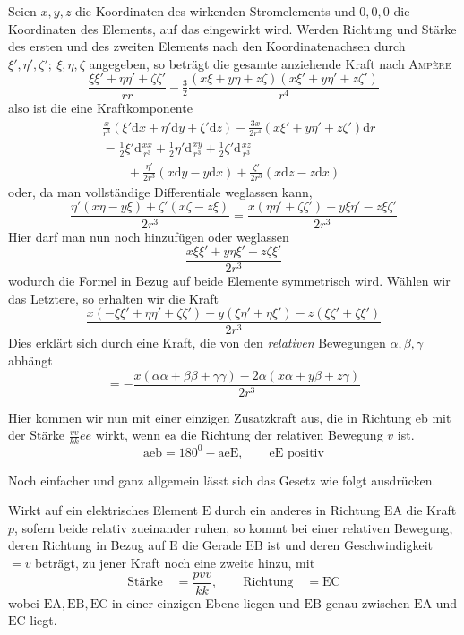 Seien $x,y,z$ die Koordinaten des wirkenden Stromelements und $0,0,0$ die Koordinaten des Elements, auf das eingewirkt wird. Werden Richtung und Stärke des ersten und des zweiten Elements nach den Koordinatenachsen durch $\xi',\eta',\zeta';\ \xi,\eta,\zeta$ angegeben, so beträgt die gesamte anziehende Kraft nach \textsc{Ampère}
\[
\frac{\xi\xi'+\eta\eta'+\zeta\zeta'}{rr}-\tfrac{3}{2}\frac{(x\xi+y\eta+z\zeta)(x\xi'+y\eta'+z\zeta')}{r^4}
\]
also ist die eine Kraftkomponente
\[
\begin{aligned}
&\frac{x}{r^3}(\xi'\mathrm dx+\eta'\mathrm dy+\zeta'\mathrm dz)-\frac{3x}{2r^4}(x\xi'+y\eta'+z\zeta')\mathrm dr\\[5pt]
&=\tfrac{1}{2}\xi'\mathrm d\frac{xx}{r^3}+\tfrac{1}{2}\eta'\mathrm d\frac{xy}{r^3}+\tfrac{1}{2}\zeta'\mathrm d\frac{xz}{r^3}\\
&\qquad+\frac{\eta'}{2r^3}(x\mathrm dy-y\mathrm dx)+\frac{\zeta'}{2r^3}(x\mathrm dz-z\mathrm dx)
\end{aligned}
\]
oder, da man vollständige Differentiale weglassen kann,
\[
\frac{\eta'(x\eta-y\xi)+\zeta'(x\zeta-z\xi)}{2r^3}=\frac{x(\eta\eta'+\zeta\zeta')-y\xi\eta'-z\xi\zeta'}{2r^3}
\]
Hier darf man nun noch hinzufügen oder weglassen
\[
\frac{x\xi\xi'+y\eta\xi'+z\zeta\xi'}{2r^3}
\]
wodurch die Formel in Bezug auf beide Elemente symmetrisch wird. Wählen wir das Letztere, so erhalten wir die Kraft
\[
\frac{x(-\xi\xi'+\eta\eta'+\zeta\zeta')-y(\xi\eta'+\eta\xi')-z(\xi\zeta'+\zeta\xi')}{2r^3}
\]
Dies erklärt sich durch eine Kraft, die von den \textit{relativen} Bewegungen $\alpha,\beta,\gamma$ abhängt
\[
=-\frac{x(\alpha\alpha+\beta\beta+\gamma\gamma)-2\alpha(x\alpha+y\beta+z\gamma)}{2r^3}
\]

Hier kommen wir nun mit einer einzigen Zusatzkraft aus, die in Richtung $\mathrm{eb}$ mit der Stärke $\frac{vv}{kk}ee$ wirkt, wenn $\mathrm{ea}$ die Richtung der relativen Bewegung $v$ ist.
\[
\mathrm{aeb}=180^0-\mathrm{aeE},\qquad\mathrm{eE}\text{ positiv}
\]
\begin{center}\end{center}

Noch einfacher und ganz allgemein lässt sich das Gesetz wie folgt ausdrücken.
\begin{center}\end{center}

Wirkt auf ein elektrisches Element $\mathrm E$ durch ein anderes in Richtung $\mathrm{EA}$ die Kraft $p$, sofern beide relativ zueinander ruhen, so kommt bei einer relativen Bewegung, deren Richtung%
%
\space in Bezug auf $\mathrm E$ die Gerade $\mathrm{EB}$ ist und deren Geschwindigkeit $=v$ beträgt, zu jener Kraft noch eine zweite hinzu, mit
\[
\text{Stärke}\quad=\frac{pvv}{kk},\qquad\text{Richtung}\quad=\mathrm{EC}
\]
wobei $\mathrm{EA,EB,EC}$ in einer einzigen Ebene liegen und $\mathrm{EB}$ genau zwischen $\mathrm{EA}$ und $\mathrm{EC}$ liegt.

